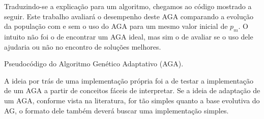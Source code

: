 Traduzindo-se a explicação para um algoritmo, chegamos ao código mostrado a seguir. Este trabalho avaliará o desempenho deste AGA comparando a evolução da população com e sem o uso do AGA para um mesmo valor inicial de $p_m$. O intuito não foi o de encontrar um AGA ideal, mas sim o de avaliar se o uso dele ajudaria ou não no encontro de soluções melhores.

\begin{algorithm}[ht]
\caption{Pseudocódigo do Algoritmo Genético Adaptativo (AGA).}
\label{alg:aga}
\end{algorithm}

A ideia por trás de uma implementação própria foi a de testar a implementação de um AGA a partir de conceitos fáceis de interpretar. Se a ideia de adaptação de um AGA, conforme vista na literatura, for tão simples quanto a base evolutiva do AG, o formato dele também deverá buscar uma implementação simples.
